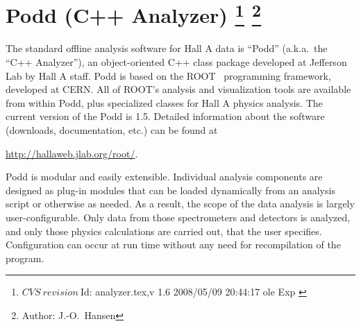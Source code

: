 
\newcommand{\cppaver}{1.5}

\chapter[Podd (C++ Analyzer)]{Podd (C++ Analyzer)
\footnote{
  $CVS~revision~ $Id: analyzer.tex,v 1.6 2008/05/09 20:44:17 ole Exp $ $
}
\footnote{Author: J.-O.\ Hansen }
}

The standard offline analysis software for Hall A data is ``Podd'' 
(a.k.a.\ the ``C++ Analyzer''), 
an object-oriented C++ class package developed at
Jefferson Lab by Hall A staff. Podd is based on the
ROOT~\cite{ROOTcern} programming framework, developed at CERN.
All of ROOT's analysis and visualization tools are available from within Podd,
plus specialized classes for Hall A physics analysis. 
The current version of the Podd is \cppaver. Detailed information about the
software (downloads, documentation, etc.) can be found at
\begin{center}
  \url{http://hallaweb.jlab.org/root/}.
\end{center}

Podd is modular and easily extensible.
Individual analysis components are designed as plug-in modules
that can be loaded dynamically from an analysis script or otherwise as needed. 
As a result, the scope of the data analysis is 
largely user-configurable. Only data from those spectrometers and 
detectors is analyzed, and only those physics calculations are carried out,
that the user specifies. Configuration can occur at run 
time without any need for recompilation of the program.


